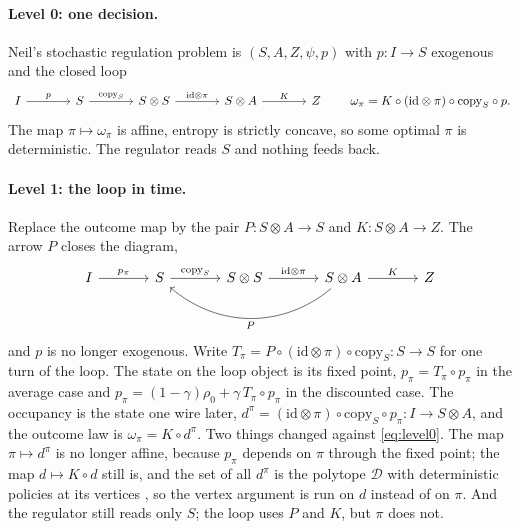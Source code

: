 \documentclass[10pt]{article}
\theoremstyle{plain}
\newcommand{\occ}{d^{\pi}}
\newcommand{\Occ}{\mathscr D}
\newcommand{\id}{\mathrm{id}}
\newcommand{\copym}[1]{\mathrm{copy}_{#1}}
\begin{document}
\paragraph{Level 0: one decision.}
Neil's stochastic regulation problem is $(S, A, Z, \psi, p)$ with $p\colon I \to S$ exogenous and the closed loop
\begin{equation}
\begin{tikzcd}[column sep=large]
I \arrow[r,"p"] & S \arrow[r,"\copym{S}"] & S \otimes S \arrow[r,"\id \otimes \pi"] & S \otimes A \arrow[r,"K"] & Z
\end{tikzcd}
\qquad
\omega_\pi = K \circ (\id \otimes \pi) \circ \copym{S} \circ p .
\label{eq:level0}
\end{equation}
The map $\pi \mapsto \omega_\pi$ is affine, entropy is strictly concave, so some optimal $\pi$ is deterministic.
The regulator reads $S$ and nothing feeds back.

\paragraph{Level 1: the loop in time.}
Replace the outcome map by the pair $P\colon S \otimes A \to S$ and $K\colon S \otimes A \to Z$.
The arrow $P$ closes the diagram,
\begin{equation}
\begin{tikzcd}[column sep=large]
I \arrow[r,"p_\pi"] & S \arrow[r,"\copym{S}"] & S \otimes S \arrow[r,"\id \otimes \pi"] & S \otimes A \arrow[r,"K"] \arrow[ll, bend left=40, "P"] & Z
\end{tikzcd}
\label{eq:level1}
\end{equation}
and $p$ is no longer exogenous.
Write $T_\pi = P \circ (\id \otimes \pi) \circ \copym{S}\colon S \to S$ for one turn of the loop.
The state on the loop object is its fixed point, $p_\pi = T_\pi \circ p_\pi$ in the average case and $p_\pi = (1-\gamma)\rho_0 + \gamma\, T_\pi \circ p_\pi$ in the discounted case.
The occupancy is the state one wire later, $\occ = (\id \otimes \pi) \circ \copym{S} \circ p_\pi\colon I \to S \otimes A$, and the outcome law is $\omega_\pi = K \circ \occ$.
Two things changed against \eqref{eq:level0}.
The map $\pi \mapsto \occ$ is no longer affine, because $p_\pi$ depends on $\pi$ through the fixed point; the map $d \mapsto K \circ d$ still is, and the set of all $\occ$ is the polytope $\Occ$ with deterministic policies at its vertices \citep{Derman-finite70ch7}, so the vertex argument is run on $d$ instead of on $\pi$.
And the regulator still reads only $S$; the loop uses $P$ and $K$, but $\pi$ does not.
\end{document}
